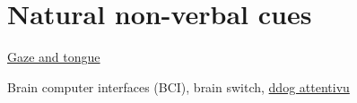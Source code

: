 \chapter{Natural non-verbal cues}
\label{chapter:Natural non-verbal cues}
\href{https://drive.google.com/drive/folders/1nPF2pdd3JJ_3Tp-POWS9YyNGcXcqJ6UV}{Gaze and tongue}



Brain computer interfaces (BCI), brain switch, \href{https://www.media.mit.edu/projects/ddog/overview/}{ddog attentivu}
